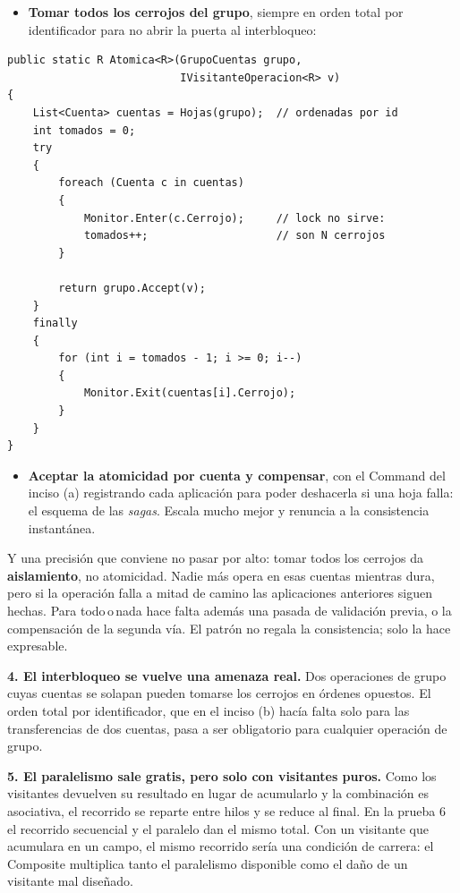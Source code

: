 \begin{itemize}[leftmargin=1.2cm]
    \item \textbf{Tomar todos los cerrojos del grupo}, siempre en orden total por
          identificador para no abrir la puerta al interbloqueo:
\end{itemize}

{\small
\begin{verbatim}
public static R Atomica<R>(GrupoCuentas grupo,
                           IVisitanteOperacion<R> v)
{
    List<Cuenta> cuentas = Hojas(grupo);  // ordenadas por id
    int tomados = 0;
    try
    {
        foreach (Cuenta c in cuentas)
        {
            Monitor.Enter(c.Cerrojo);     // lock no sirve:
            tomados++;                    // son N cerrojos
        }

        return grupo.Accept(v);
    }
    finally
    {
        for (int i = tomados - 1; i >= 0; i--)
        {
            Monitor.Exit(cuentas[i].Cerrojo);
        }
    }
}
\end{verbatim}
}

\begin{itemize}[leftmargin=1.2cm]
    \item \textbf{Aceptar la atomicidad por cuenta y compensar}, con el Command del inciso (a)
          registrando cada aplicación para poder deshacerla si una hoja falla: el esquema de
          las \textit{sagas}. Escala mucho mejor y renuncia a la consistencia instantánea.
\end{itemize}

Y una precisión que conviene no pasar por alto: tomar todos los cerrojos da
\textbf{aislamiento}, no atomicidad. Nadie más opera en esas cuentas mientras dura, pero si la
operación falla a mitad de camino las aplicaciones anteriores siguen hechas. Para
todo\,o\,nada hace falta además una pasada de validación previa, o la compensación de la
segunda vía. El patrón no regala la consistencia; solo la hace expresable.

\textbf{4. El interbloqueo se vuelve una amenaza real.} Dos operaciones de grupo cuyas cuentas
se solapan pueden tomarse los cerrojos en órdenes opuestos. El orden total por identificador,
que en el inciso (b) hacía falta solo para las transferencias de dos cuentas, pasa a ser
obligatorio para cualquier operación de grupo.

\textbf{5. El paralelismo sale gratis, pero solo con visitantes puros.} Como los visitantes
devuelven su resultado en lugar de acumularlo y la combinación es asociativa, el recorrido se
reparte entre hilos y se reduce al final. En la prueba 6 el recorrido secuencial y el paralelo
dan el mismo total. Con un visitante que acumulara en un campo, el mismo recorrido sería una
condición de carrera: el Composite multiplica tanto el paralelismo disponible como el daño de
un visitante mal diseñado.

